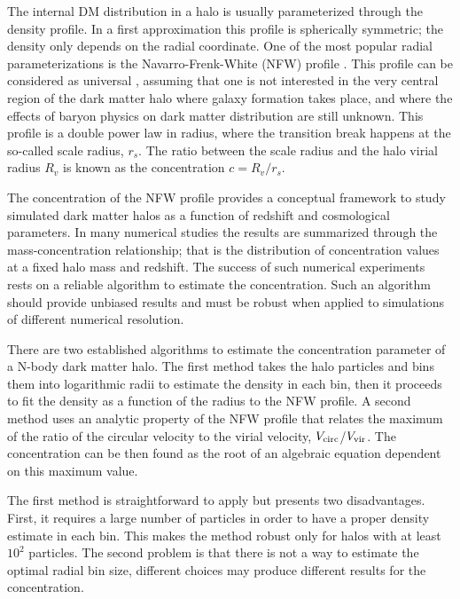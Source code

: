 \documentclass{emulateapj}
\begin{document}
The internal DM distribution in a halo is usually parameterized
through the density profile.  In a first approximation this profile is
spherically symmetric; the density only depends on the radial
coordinate.  One of the most popular radial parameterizations is
the Navarro-Frenk-White (NFW) profile \citep{NFW}.  
This profile can be considered as universal \citep{Navarro2010}, assuming that 
one is not interested in the very central region of the dark matter halo where
galaxy formation takes place, and where the effects of baryon physics
on dark matter distribution are still unknown.
This profile is a double power law in radius, where the transition
break happens at the so-called scale radius, $r_s$.  The ratio between
the scale radius and the halo virial radius $R_v$ is known as the
concentration $c=R_v/r_s$.


The concentration of the NFW profile provides a conceptual framework
to study simulated dark matter halos as a function of redshift and
cosmological parameters.  In many numerical studies
\citep{Neto2007,Maccio2008,Duffy2008,Munoz2011,Prada2012,Ludlow2014}
the results are summarized through the mass-concentration
relationship; that is the distribution of concentration values at a
fixed halo mass and redshift.  The success of such numerical
experiments rests on a reliable algorithm to estimate the
concentration.  Such an algorithm should provide unbiased results and
must be robust when applied to simulations of different numerical
resolution.

There are two established algorithms to estimate the concentration
parameter of a N-body dark matter halo.  The first method takes the
halo particles and bins them into logarithmic radii to estimate the
density in each bin, then it proceeds to fit the density as a function
of the radius to the NFW profile.  A second method uses an analytic
property of the NFW profile that relates the maximum of the ratio of
the circular velocity to the virial velocity, $V_{\rm circ}$/$V_{\rm
  vir}$.  The concentration can be then found as the root of an
algebraic equation dependent on this maximum value.

The first method is straightforward to apply but presents two
disadvantages.  First, it requires a large number of particles in
order to have a proper density estimate in each bin.  This makes the
method robust only for halos with at least $10^2$ particles.  The
second problem is that there is not a way to estimate the optimal
radial bin size, different choices may produce different results for
the concentration.
\end{document}
